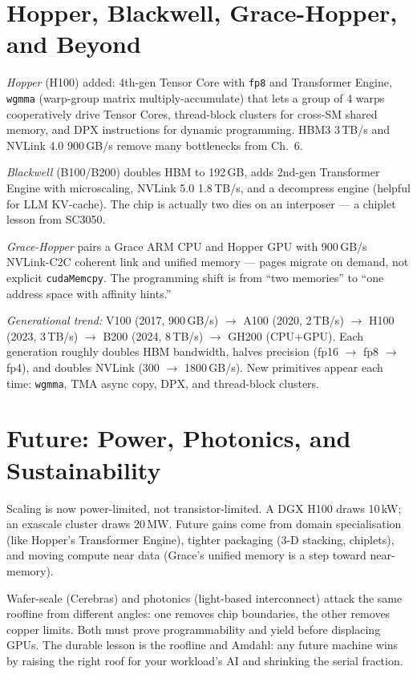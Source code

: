 \section{Hopper, Blackwell, Grace-Hopper, and Beyond}
\emph{Hopper} (H100) added: 4th-gen Tensor Core with \texttt{fp8} and Transformer Engine, \texttt{wgmma} (warp-group matrix multiply-accumulate) that lets a group of 4 warps cooperatively drive Tensor Cores, thread-block clusters for cross-SM shared memory, and DPX instructions for dynamic programming. HBM3 3\,TB/s and NVLink 4.0 900\,GB/s remove many bottlenecks from Ch.~6.

\emph{Blackwell} (B100/B200) doubles HBM to 192\,GB, adds 2nd-gen Transformer Engine with microscaling, NVLink 5.0 1.8\,TB/s, and a decompress engine (helpful for LLM KV-cache). The chip is actually two dies on an interposer --- a chiplet lesson from SC3050.

\emph{Grace-Hopper} pairs a Grace ARM CPU and Hopper GPU with 900\,GB/s NVLink-C2C coherent link and unified memory --- pages migrate on demand, not explicit \texttt{cudaMemcpy}. The programming shift is from ``two memories'' to ``one address space with affinity hints.''

\noindent\textit{Generational trend:} V100 (2017, 900\,GB/s) $\to$ A100 (2020, 2\,TB/s) $\to$ H100 (2023, 3\,TB/s) $\to$ B200 (2024, 8\,TB/s) $\to$ GH200 (CPU+GPU). Each generation roughly doubles HBM bandwidth, halves precision (fp16 $\to$ fp8 $\to$ fp4), and doubles NVLink (300 $\to$ 1800\,GB/s). New primitives appear each time: \texttt{wgmma}, TMA async copy, DPX, and thread-block clusters.

\section{Future: Power, Photonics, and Sustainability}
Scaling is now power-limited, not transistor-limited. A DGX H100 draws 10\,kW; an exascale cluster draws 20\,MW. Future gains come from domain specialisation (like Hopper's Transformer Engine), tighter packaging (3-D stacking, chiplets), and moving compute near data (Grace's unified memory is a step toward near-memory).

Wafer-scale (Cerebras) and photonics (light-based interconnect) attack the same roofline from different angles: one removes chip boundaries, the other removes copper limits. Both must prove programmability and yield before displacing GPUs. The durable lesson is the roofline and Amdahl: any future machine wins by raising the right roof for your workload's AI and shrinking the serial fraction.

